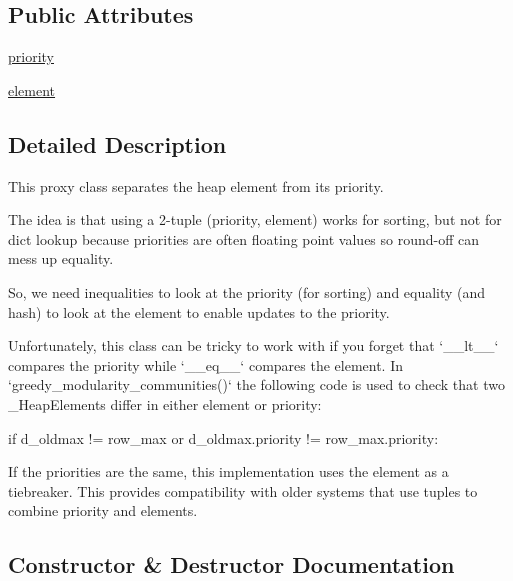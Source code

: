 \subsection*{Public Attributes}
\begin{DoxyCompactItemize}
\item 
\hyperlink{classnetworkx_1_1utils_1_1mapped__queue_1_1__HeapElement_ae7a91aff4e379dbdee68da8d797fdc89}{priority}
\item 
\hyperlink{classnetworkx_1_1utils_1_1mapped__queue_1_1__HeapElement_a02d1ece42ec5e7458bec0337c766bb24}{element}
\end{DoxyCompactItemize}


\subsection{Detailed Description}
\begin{DoxyVerb}This proxy class separates the heap element from its priority.

The idea is that using a 2-tuple (priority, element) works
for sorting, but not for dict lookup because priorities are
often floating point values so round-off can mess up equality.

So, we need inequalities to look at the priority (for sorting)
and equality (and hash) to look at the element to enable
updates to the priority.

Unfortunately, this class can be tricky to work with if you forget that
`__lt__` compares the priority while `__eq__` compares the element.
In `greedy_modularity_communities()` the following code is
used to check that two _HeapElements differ in either element or priority:

    if d_oldmax != row_max or d_oldmax.priority != row_max.priority:

If the priorities are the same, this implementation uses the element
as a tiebreaker. This provides compatibility with older systems that
use tuples to combine priority and elements.
\end{DoxyVerb}
 

\subsection{Constructor \& Destructor Documentation}
\mbox{\label{classnetworkx_1_1utils_1_1mapped__queue_1_1__HeapElement_a8b6cde8ccbc44a76f73bab76eac6b6ee}} 
